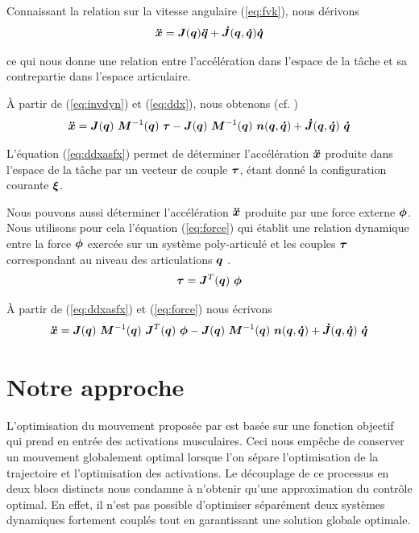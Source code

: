 \documentclass[pdftex,a4paper,11pt]{article}
\begin{document}
Connaissant la relation sur la vitesse angulaire (\ref{eq:fvk}), nous dérivons
\begin{equation}
    \label{eq:ddx}
    \boldsymbol{\ddot{x}} = \boldsymbol{J}(\boldsymbol{q}) \boldsymbol{\ddot{q}} + \boldsymbol{\dot{J}}(\boldsymbol{q}, \boldsymbol{\dot{q}}) \boldsymbol{\dot{q}} 
\end{equation}

ce qui nous donne une relation entre l'accélération dans l'espace de la tâche
et sa contrepartie dans l'espace articulaire.

À partir de (\ref{eq:invdyn}) et (\ref{eq:ddx}), nous obtenons (cf. \cite{siciliano2009robotics})
\begin{equation}
    \label{eq:ddxasfx}
    \boldsymbol{\ddot{x}} = \boldsymbol{J}(\boldsymbol{q}) ~ \boldsymbol{M}^{-1}(\boldsymbol{q}) ~ \boldsymbol{\tau} - \boldsymbol{J}(\boldsymbol{q}) ~ \boldsymbol{M}^{-1}(\boldsymbol{q}) ~ \boldsymbol{n}( \boldsymbol{q}, \boldsymbol{\dot{q}} ) + \boldsymbol{\dot{J}}(\boldsymbol{q}, \boldsymbol{\dot{q}}) ~ \boldsymbol{\dot{q}}
\end{equation}

L'équation (\ref{eq:ddxasfx}) permet de déterminer l'accélération $\boldsymbol{\ddot{x}}$
produite dans l'espace de la tâche par un vecteur de couple $\boldsymbol{\tau}$, étant donné
la configuration courante $\boldsymbol{\xi}$.

Nous pouvons aussi déterminer l'accélération $\boldsymbol{\ddot{x}}$ produite par une force externe $\boldsymbol{\phi}$.
Nous utilisons pour cela l'équation (\ref{eq:force}) qui établit une relation dynamique entre la force
$\boldsymbol{\phi}$ exercée sur un système poly-articulé et les couples $\boldsymbol{\tau}$ correspondant
au niveau des articulations $\boldsymbol{q}$ \cite{siciliano2009robotics}.
\begin{equation}
    \boldsymbol{\tau} = \boldsymbol{J}^T(\boldsymbol{q}) ~ \boldsymbol{\phi}
    \label{eq:force}
\end{equation}

À partir de (\ref{eq:ddxasfx}) et (\ref{eq:force}) nous écrivons
\begin{equation}
    \label{eq:ddxasfx2}
    \boldsymbol{\ddot{x}} = \boldsymbol{J}(\boldsymbol{q}) ~ \boldsymbol{M}^{-1}(\boldsymbol{q}) ~ \boldsymbol{J}^T(\boldsymbol{q}) ~ \boldsymbol{\phi} - \boldsymbol{J}(\boldsymbol{q}) ~ \boldsymbol{M}^{-1}(\boldsymbol{q}) ~ \boldsymbol{n}( \boldsymbol{q}, \boldsymbol{\dot{q}} ) + \boldsymbol{\dot{J}}(\boldsymbol{q}, \boldsymbol{\dot{q}}) ~ \boldsymbol{\dot{q}}
\end{equation}


\section{Notre approche}
\label{sec:approach}

L'optimisation du mouvement proposée par \cite{rigoux11} est basée sur une
fonction objectif qui prend en entrée des activations musculaires. Ceci nous
empêche de conserver un mouvement globalement optimal lorsque l'on sépare
l'optimisation de la trajectoire et l'optimisation des activations.  Le
dé\-cou\-plage de ce processus en deux blocs distincts nous condamne à n'obtenir
qu'une approximation du contrôle optimal.
En effet, il n'est pas possible d'optimiser séparément deux systèmes dynamiques
fortement couplés tout en garantissant une solution globale optimale.
\end{document}
